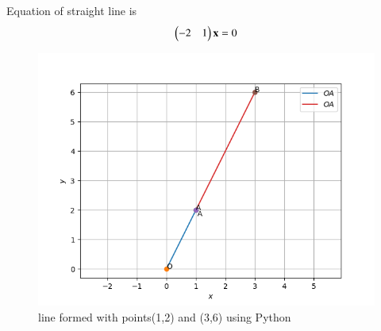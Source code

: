 \documentclass[journal,12pt,twocolumn]{IEEEtran}
\begin{document}
    Equation of straight line is 
\begin{align}
    \begin{pmatrix}-2&1\end{pmatrix} \mathbf{x}=0 
\end{align}
\begin{figure}[H]
\centering
\includegraphics[width=\columnwidth]{Figure_1.png}
\caption{line formed with points(1,2) and (3,6) using Python}
\label{fig:1}
\end{figure}
\end{document}
